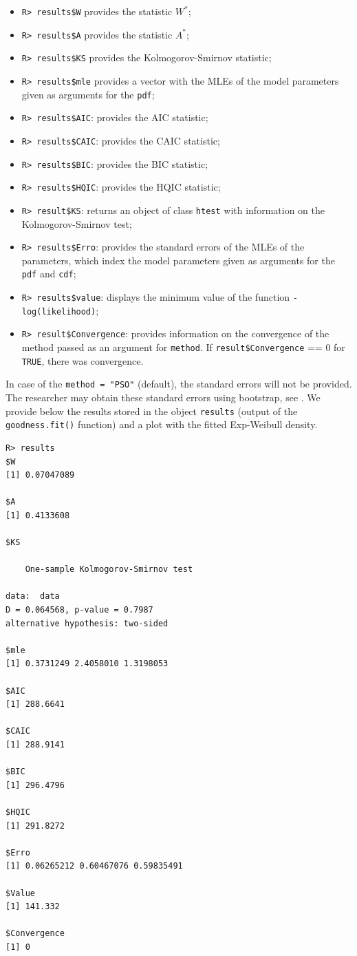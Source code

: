 \documentclass[10pt,letterpaper]{article}
\begin{document}
\begin{itemize}
	\item \texttt{R> results\$W} provides the statistic $W^*$;
	\item \texttt{R> results\$A} provides the statistic $A^*$;
	\item \texttt{R> results\$KS} provides the Kolmogorov-Smirnov statistic;
	\item \texttt{R> results\$mle} provides a vector with the MLEs of the model parameters given as arguments for the \texttt{pdf};
	\item \texttt{R> results\$AIC}: provides the AIC statistic;
	\item \texttt{R> results\$CAIC}: provides the CAIC statistic;
	\item \texttt{R> results\$BIC}: provides the BIC statistic;
	\item \texttt{R> results\$HQIC}: provides the HQIC statistic;
	\item \texttt{R> result\$KS}: returns an object of class \texttt{htest} with information on the Kolmogorov-Smirnov test;
	\item \texttt{R> results\$Erro}: provides the standard errors of the MLEs of the parameters, which index the model parameters given as arguments for the \texttt{pdf} and \texttt{cdf};
	\item \texttt{R> results\$value}: displays the minimum value of the function \texttt{-log(likelihood)};
	\item \texttt{R> result\$Convergence}: provides information on the convergence of the method passed as an argument for \texttt{method}. If \texttt{result\$Convergence} == 0 for \texttt{TRUE}, there was convergence. 	
\end{itemize}

In case of the \texttt{method = "PSO"} (default), the standard errors will not be provided. The researcher may obtain these
standard errors using bootstrap, see \cite{davisonhinckley1997}. We provide below the results
stored in the object \texttt{results} (output of the \texttt{goodness.fit()} function) and a plot with the fitted Exp-Weibull density.
\begin{verbatim}
R> results
$W
[1] 0.07047089
		
$A
[1] 0.4133608
		
$KS
		
	One-sample Kolmogorov-Smirnov test
		
data:  data
D = 0.064568, p-value = 0.7987
alternative hypothesis: two-sided
		
$mle
[1] 0.3731249 2.4058010 1.3198053
		
$AIC
[1] 288.6641
		
$CAIC
[1] 288.9141
		
$BIC
[1] 296.4796
		
$HQIC
[1] 291.8272
		
$Erro
[1] 0.06265212 0.60467076 0.59835491
		
$Value
[1] 141.332
		
$Convergence
[1] 0
\end{verbatim}
\end{document}
